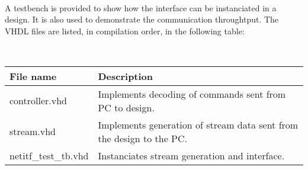 \documentclass[a4paper]{hitec}
\begin{document}
\ \\
A testbench is provided to show how the interface can be instanciated in a design. It is also used to demonstrate the communication throughtput. The VHDL files are listed, in compilation order, in the following table:

\ \\
\begin{tabularx}{\linewidth}{|lX|}
	\hline
	File name & Description \\
	\hline
	controller.vhd       & Implements decoding of commands sent from PC to design. \\
	stream.vhd           & Implements generation of stream data sent from the design to the PC. \\
	netitf\_test\_tb.vhd & Instanciates stream generation and interface. \\
	\hline
\end{tabularx}
\end{document}
